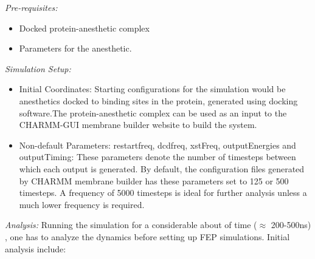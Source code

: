 \documentclass[12pt]{article}
\begin{document}
\textit{Pre-requisites:} 
\begin{itemize}
 \item Docked protein-anesthetic complex
 \item Parameters for the anesthetic.
\end{itemize}
\textit{Simulation Setup:}
\begin{itemize}
 \item Initial Coordinates: Starting configurations for the simulation would be anesthetics docked to binding sites in the protein, generated using docking software.The protein-anesthetic complex can be used as an input to the  CHARMM-GUI membrane builder website\cite{Jo2009} to build the system.

\item Non-default Parameters: 
	restartfreq, dcdfreq, xstFreq, outputEnergies and outputTiming: These parameters denote the number of timesteps between which each output is generated. By default, the configuration files generated by CHARMM membrane builder has these parameters set to 125 or 500 timesteps. A frequency of 5000 timesteps is ideal for further analysis unless a much lower frequency is required.
 \end{itemize}
\textit{Analysis:}
Running the simulation for a considerable about of time ($\approx$ 200-500ns) , one has to analyze the dynamics before setting up FEP simulations. Initial analysis include:  
\end{document}
